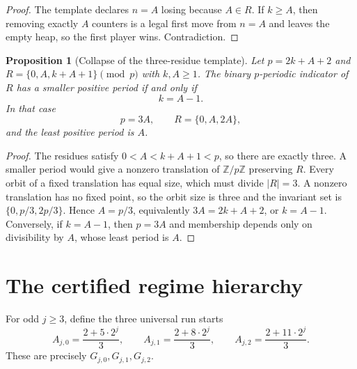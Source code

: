 \documentclass[11pt]{article}
\newtheorem{proposition}[theorem]{Proposition}
\theoremstyle{remark}
\begin{document}
\begin{proof}
The template declares \(n=A\) losing because \(A\in R\). If \(k\ge A\), then removing exactly \(A\) counters is a legal first move from \(n=A\) and leaves the empty heap, so the first player wins. Contradiction.
\end{proof}

\begin{proposition}[Collapse of the three-residue template]\label{prop:collapse}
Let \(p=2k+A+2\) and \(R=\{0,A,k+A+1\}\pmod p\) with \(k,A\ge1\). The binary \(p\)-periodic indicator of \(R\) has a smaller positive period if and only if
\begin{equation}\label{eq:collapse}
k=A-1.
\end{equation}
In that case
\[
p=3A,\qquad R=\{0,A,2A\},
\]
and the least positive period is \(A\).
\end{proposition}

\begin{proof}
The residues satisfy \(0<A<k+A+1<p\), so there are exactly three. A smaller period would give a nonzero translation of \(\mathbb Z/p\mathbb Z\) preserving \(R\). Every orbit of a fixed translation has equal size, which must divide \(|R|=3\). A nonzero translation has no fixed point, so the orbit size is three and the invariant set is \(\{0,p/3,2p/3\}\). Hence \(A=p/3\), equivalently \(3A=2k+A+2\), or \(k=A-1\). Conversely, if \(k=A-1\), then \(p=3A\) and membership depends only on divisibility by \(A\), whose least period is \(A\).
\end{proof}

\section{The certified regime hierarchy}\label{sec:hierarchy}

For odd \(j\ge3\), define the three universal run starts
\begin{equation}\label{eq:Avalues}
A_{j,0}=\frac{2+5\cdot2^j}{3},
\qquad
A_{j,1}=\frac{2+8\cdot2^j}{3},
\qquad
A_{j,2}=\frac{2+11\cdot2^j}{3}.
\end{equation}
These are precisely \(G_{j,0},G_{j,1},G_{j,2}\).
\end{document}
